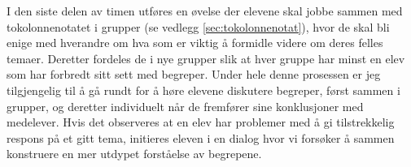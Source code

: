 \documentclass[main.tex]{subfiles}
\begin{document}
\newline
\newline
I den siste delen av timen utføres en øvelse der elevene skal jobbe sammen med tokolonnenotatet i 
grupper (se vedlegg \ref{sec:tokolonnenotat}), hvor de skal bli enige med hverandre om hva som er 
viktig å formidle videre om deres felles temaer. Deretter fordeles de i nye grupper slik at hver 
gruppe har minst en elev som har forbredt sitt sett med begreper. Under hele denne prosessen er jeg 
tilgjengelig til å gå rundt for å høre elevene diskutere begreper, først sammen i grupper, og 
deretter individuelt når de fremfører sine konklusjoner med medelever. Hvis det observeres at en 
elev har problemer med å gi tilstrekkelig respons på et gitt tema, initieres eleven i en dialog 
hvor vi forsøker å sammen konstruere en mer utdypet forståelse av begrepene.
\end{document}
